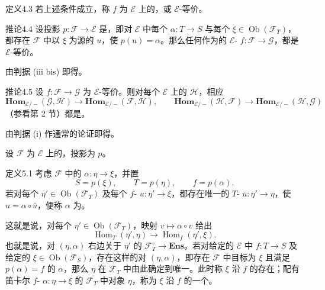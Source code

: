 \begin{SGAresult}{定义}{4.3}
若上述条件成立，称 $f$ 为 $\mathcal E$ 上的，或 $\mathcal E$-等价。
\end{SGAresult}

\begin{SGAresult}{推论}{4.4}
设投影 $p:\mathcal F\to\mathcal E$ 是，即对 $\mathcal E$ 中每个 $\alpha:T\to S$ 与每个 $\xi\in\operatorname{Ob}(\mathcal F_T)$，都存在 $\mathcal F$ 中以 $\xi$ 为源的 $u$，使 $p(u)=\alpha$。那么任何作为的 $\mathcal E$- $f:\mathcal F\to\mathcal G$，都是 $\mathcal E$-等价。
\end{SGAresult}
由判据 (iii bis) 即得。

\begin{SGAresult}{推论}{4.5}
设 $f:\mathcal F\to\mathcal G$ 为 $\mathcal E$-等价。则对每个 $\mathcal E$ 上的 $\mathcal H$，相应
\[
 \mathbf{Hom}_{\mathcal E/-}(\mathcal G,\mathcal H)\longrightarrow
 \mathbf{Hom}_{\mathcal E/-}(\mathcal F,\mathcal H),\qquad
 \mathbf{Hom}_{\mathcal E/-}(\mathcal H,\mathcal F)\longrightarrow
 \mathbf{Hom}_{\mathcal E/-}(\mathcal H,\mathcal G)
\]
（参看第 2 节）都是。
\end{SGAresult}
由判据 (i) 作通常的论证即得。

设 $\mathcal F$ 为 $\mathcal E$ 上的，投影为 $p$。

\begin{SGAresult}{定义}{5.1}
考虑 $\mathcal F$ 中的 $\alpha:\eta\to\xi$，并置
\[
 S=p(\xi),\qquad T=p(\eta),\qquad f=p(\alpha).
\]
若对每个 $\eta'\in\operatorname{Ob}(\mathcal F_T)$ 及每个 $f$- $u:\eta'\to\xi$，都存在唯一的 $T$- $\bar u:\eta'\to\eta$，使 $u=\alpha\circ\bar u$，便称 $\alpha$ 为。
\end{SGAresult}
这就是说，对每个 $\eta'\in\operatorname{Ob}(\mathcal F_T)$，映射 $v\mapsto\alpha\circ v$ 给出
\[
 \operatorname{Hom}_T(\eta',\eta)\longrightarrow\operatorname{Hom}_f(\eta',\xi).\tag{i}
\]
也就是说，对 $(\eta,\alpha)$ 右边关于 $\eta'$ 的 $\mathcal F_T^\circ\to\mathbf{Ens}$。若对给定的 $\mathcal E$ 中 $f:T\to S$ 及给定的 $\xi\in\operatorname{Ob}(\mathcal F_S)$，存在这样的对 $(\eta,\alpha)$，即存在 $\mathcal F$ 中目标为 $\xi$ 且满足 $p(\alpha)=f$ 的 $\alpha$，那么 $\eta$ 在 $\mathcal F_T$ 中由此确定到唯一。此时称 $\xi$ 沿 $f$ 的存在；配有笛卡尔 $f$- $\alpha:\eta\to\xi$ 的 $\mathcal F_T$ 中对象 $\eta$，称为 $\xi$ 沿 $f$ 的一个。

